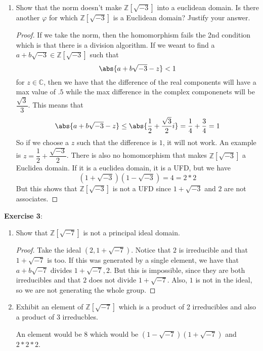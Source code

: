 \documentclass{article}
\begin{document}
\begin{enumerate}
	\item Show that the norm doesn't make $\mathbb{Z}[\sqrt{-3}]$ into a euclidean domain. Is there another $\varphi$ for which $\mathbb{Z}[\sqrt{-3}]$ is a Euclidean domain? Justify your answer.
		\begin{proof}
			If we take the norm, then the homomorphism fails the 2nd condition which is that there is a division algorithm. If we weant to find a $a + b\sqrt{-3} \in \mathbb{Z}[\sqrt{-3}]$ such that 
			\begin{equation*}
				\abs{a + b\sqrt{-3} - z} < 1
			\end{equation*}
			for $z \in \mathbb{C}$, then we have that the difference of the real components will have a max value of $.5$ while the max difference in the complex componenets will be $\dfrac{\sqrt{3}}{3}$. This means that
			\begin{equation*}
				\abs{a + b\sqrt{-3} - z} \leq \abs{\dfrac{1}{2} + \dfrac{\sqrt{3}}{2}i} = \dfrac{1}{4} + \dfrac{3}{4} = 1
			\end{equation*}
			So if we choose a $z$ such that the difference is $1$, it will not work. An example is $z = \dfrac{1}{2} + \dfrac{\sqrt{-3}}{2}$. There is also no homomorphism that makes $\mathbb{Z}[\sqrt{-3}]$ a Euclidea domain. If it is a euclidea domain, it is a UFD, but we have
			\begin{equation*}
				(1 + \sqrt{-3})(1 - \sqrt{-3}) = 4 = 2*2
			\end{equation*}
			But this shows that $\mathbb{Z}[\sqrt{-3}]$ is not a UFD since $1 + \sqrt{-3}$ and $2$ are not associates.
		\end{proof}
\end{enumerate}
\textbf{Exercise 3}:
\begin{enumerate}
	\item Show that $\mathbb{Z}[\sqrt{-7}]$ is not a principal ideal domain.
		\begin{proof}
			Take the ideal $(2, 1 + \sqrt{-7})$. Notice that $2$ is irreducible and that $1 + \sqrt{-7}$ is too. If this was generated by a single element, we have that $a + b\sqrt{-7}$ divides $1 + \sqrt{-7}, 2$. But this is impossible, since they are both irreducibles and that $2$ does not divide $1 + \sqrt{-7}$. Also, $1$ is not in the ideal, so we are not generating the whole group.
		\end{proof}

	\item Exhibit an element of $\mathbb{Z}[\sqrt{-7}]$ which is a product of 2 irreducibles and also a product of 3 irreducbles.

	An element would be 8 which would be $(1 - \sqrt{-7})(1 + \sqrt{-7})$ and $2 * 2 * 2$.
\end{enumerate}
\end{document}
